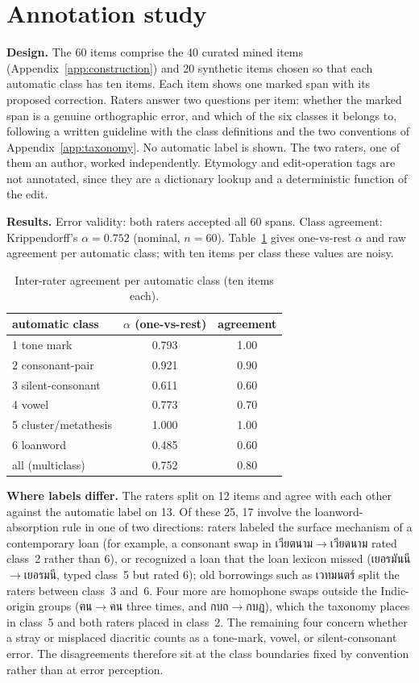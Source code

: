 \documentclass[11pt]{article}
\begin{document}
\section{Annotation study}
\label{app:annotation}
\textbf{Design.} The 60 items comprise the 40 curated mined items (Appendix~\ref{app:construction})
and 20 synthetic items chosen
so that each automatic class has ten items. Each item shows one marked span with its proposed
correction. Raters answer two questions per item: whether the marked span is a genuine
orthographic error, and which of the six classes it belongs to, following a written guideline
with the class definitions and the two conventions of Appendix~\ref{app:taxonomy}. No automatic
label is shown. The two raters, one of them an author, worked independently. Etymology and edit-operation tags are not
annotated, since they are a dictionary lookup and a deterministic function of the edit.

\textbf{Results.} Error validity: both raters accepted all 60 spans. Class agreement:
Krippendorff's $\alpha = 0.752$ (nominal, $n = 60$). Table~\ref{tab:alpha} gives one-vs-rest
$\alpha$ and raw agreement per automatic class; with ten items per class these values are noisy.

\begin{table}[t]
\centering\small\setlength{\tabcolsep}{4pt}
\begin{tabular}{@{}lcc@{}}
\toprule
automatic class & $\alpha$ (one-vs-rest) & agreement \\
\midrule
1 tone mark          & 0.793 & 1.00 \\
2 consonant-pair     & 0.921 & 0.90 \\
3 silent-consonant   & 0.611 & 0.60 \\
4 vowel              & 0.773 & 0.70 \\
5 cluster/metathesis & 1.000 & 1.00 \\
6 loanword           & 0.485 & 0.60 \\
\midrule
all (multiclass)     & 0.752 & 0.80 \\
\bottomrule
\end{tabular}
\caption{Inter-rater agreement per automatic class (ten items each).}
\label{tab:alpha}
\end{table}

\textbf{Where labels differ.} The raters split on 12 items and agree with each other against the
automatic label on 13. Of these 25, 17 involve the loanword-absorption rule in one of two
directions: raters labeled the surface mechanism of a contemporary loan (for example, a
consonant swap in เวียตนาม$\to$เวียดนาม rated class~2 rather than 6), or recognized a loan that
the loan lexicon missed (เยอรมันนี$\to$เยอรมนี, typed class~5 but rated 6); old borrowings such
as เวทมนตร์ split the raters between class~3 and~6. Four more are homophone swaps outside the
Indic-origin groups (ฅน$\to$คน three times, and กบถ$\to$กบฏ), which the taxonomy places in
class~5 and both raters placed in class~2. The remaining four concern whether a stray or
misplaced diacritic counts as a tone-mark, vowel, or silent-consonant error. The disagreements
therefore sit at the class boundaries fixed by convention rather than at error perception.
\end{document}
